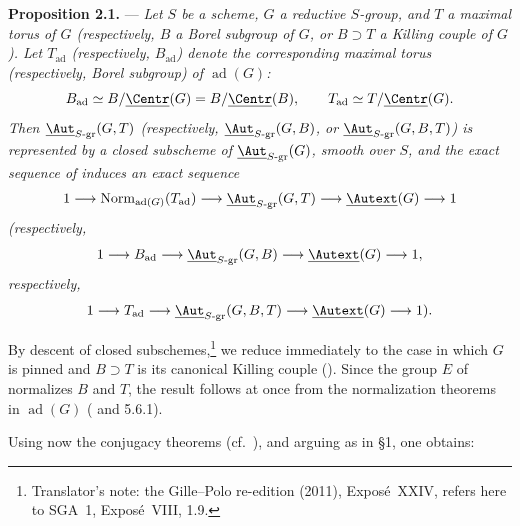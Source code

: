 \medskip\noindent\textbf{Proposition 2.1.} ---
{\itshape Let \(S\) be a scheme, \(G\) a reductive \(S\)-group, and
\(T\) a maximal torus of \(G\) (respectively, \(B\) a Borel subgroup
of \(G\), or \(B\supset T\) a Killing couple of \(G\)). Let
\(T_{\mathrm{ad}}\) (respectively, \(B_{\mathrm{ad}}\)) denote the
corresponding maximal torus (respectively, Borel subgroup) of
\(\operatorname{ad}(G)\):
\[
  B_{\mathrm{ad}}
  \simeq B/\underline{\Centr}(G)
  =B/\underline{\Centr}(B),
  \qquad
  T_{\mathrm{ad}}\simeq T/\underline{\Centr}(G).
\]
Then
\(\underline{\Aut}_{S\text{-}\mathrm{gr}}(G,T)\)
(respectively,
\(\underline{\Aut}_{S\text{-}\mathrm{gr}}(G,B)\), or
\(\underline{\Aut}_{S\text{-}\mathrm{gr}}(G,B,T)\))
is represented by a closed subscheme of
\(\underline{\Aut}_{S\text{-}\mathrm{gr}}(G)\), smooth over \(S\),
and the exact sequence of  induces an exact sequence
\[
  1\longrightarrow
  \operatorname{Norm}_{\operatorname{ad}(G)}(T_{\mathrm{ad}})
  \longrightarrow
  \underline{\Aut}_{S\text{-}\mathrm{gr}}(G,T)
  \longrightarrow
  \underline{\Autext}(G)
  \longrightarrow1
\]
\textup{(}respectively,
\[
  1\longrightarrow B_{\mathrm{ad}}
  \longrightarrow
  \underline{\Aut}_{S\text{-}\mathrm{gr}}(G,B)
  \longrightarrow
  \underline{\Autext}(G)
  \longrightarrow1,
\]
respectively,
\[
  1\longrightarrow T_{\mathrm{ad}}
  \longrightarrow
  \underline{\Aut}_{S\text{-}\mathrm{gr}}(G,B,T)
  \longrightarrow
  \underline{\Autext}(G)
  \longrightarrow1\textup{)}.
\]}

By descent of closed subschemes,\footnote{Translator's note: the Gille--Polo re-edition (2011), Exposé~XXIV, refers here to SGA~1,
Exposé~VIII, 1.9.} we reduce immediately to the case in which \(G\) is
pinned and \(B\supset T\) is its canonical Killing couple
(). Since the group \(E\) of  normalizes
\(B\) and \(T\), the result follows at once from the normalization
theorems in \(\operatorname{ad}(G)\) ( and 5.6.1).


Using now the conjugacy theorems (cf.\ ), and arguing
as in \S1, one obtains:

